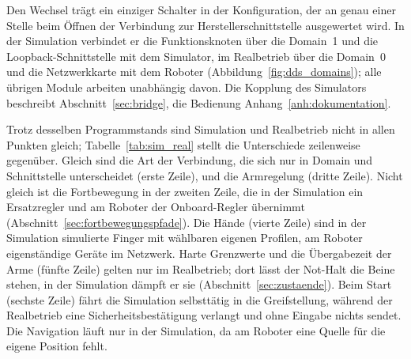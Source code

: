 Den Wechsel trägt ein einziger Schalter in der Konfiguration, der an genau einer Stelle beim Öffnen der Verbindung zur Herstellerschnittstelle ausgewertet wird.
In der Simulation verbindet er die Funktionsknoten über die Domain~1 und die Loopback-Schnittstelle mit dem Simulator, im Realbetrieb über die Domain~0 und die Netzwerkkarte mit dem Roboter (Abbildung~\ref{fig:dds_domains}); alle übrigen Module arbeiten unabhängig davon.
Die Kopplung des Simulators beschreibt Abschnitt~\ref{sec:bridge}, die Bedienung Anhang~\ref{anh:dokumentation}.

Trotz desselben Programmstands sind Simulation und Realbetrieb nicht in allen Punkten gleich; Tabelle~\ref{tab:sim_real} stellt die Unterschiede zeilenweise gegenüber.
Gleich sind die Art der Verbindung, die sich nur in Domain und Schnittstelle unterscheidet (erste Zeile), und die Armregelung (dritte Zeile).
Nicht gleich ist die Fortbewegung in der zweiten Zeile, die in der Simulation ein Ersatzregler und am Roboter der Onboard-Regler übernimmt (Abschnitt~\ref{sec:fortbewegungspfade}).
Die Hände (vierte Zeile) sind in der Simulation simulierte Finger mit wählbaren eigenen Profilen, am Roboter eigenständige Geräte im Netzwerk.
Harte Grenzwerte und die Übergabezeit der Arme (fünfte Zeile) gelten nur im Realbetrieb; dort lässt der Not-Halt die Beine stehen, in der Simulation dämpft er sie (Abschnitt~\ref{sec:zustaende}).
Beim Start (sechste Zeile) fährt die Simulation selbsttätig in die Greifstellung, während der Realbetrieb eine Sicherheitsbestätigung verlangt und ohne Eingabe nichts sendet.
Die Navigation läuft nur in der Simulation, da am Roboter eine Quelle für die eigene Position fehlt.

